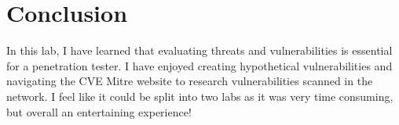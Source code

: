 \section{Conclusion}
\label{lab3-conclusion}
In this lab, I have learned that evaluating threats and vulnerabilities is
essential for a penetration tester. I have enjoyed creating hypothetical
vulnerabilities and navigating the CVE Mitre website to research vulnerabilities
scanned in the network. I feel like it could be split into two labs as it was
very time consuming, but overall an entertaining experience!

